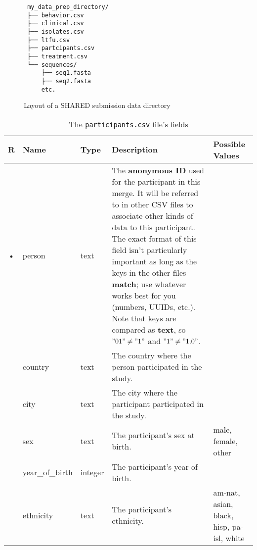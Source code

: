 \documentclass{article}
\begin{document}
\begin{figure}
  \caption{Layout of a SHARED submission data directory}
  \label{fig:data-prep-dir}
\begin{verbatim}
 my_data_prep_directory/
 ├── behavior.csv
 ├── clinical.csv
 ├── isolates.csv
 ├── ltfu.csv
 ├── partcipants.csv
 ├── treatment.csv
 └── sequences/
     ├── seq1.fasta
     ├── seq2.fasta
     etc.
\end{verbatim}
\end{figure}


\begin{table}[h!]
  \centering
  \caption{The \texttt{participants.csv} file's fields}
  \label{tbl:participants.csv}
  \begin{tabular}{cllp{6cm}p{4cm}}
    R & Name            & Type      & Description & Possible Values\\ \hline
    • & person          & text    &
      The \textbf{anonymous ID} used for the participant in this
      merge. It will be referred to in other CSV files to associate
      other kinds of data to this participant. The exact format of
      this field isn't particularly important as long as the keys in
      the other files \textbf{match}; use whatever works best for you
      (numbers, UUIDs, etc.). Note that keys are compared as
      \textbf{text}, so $"01" \neq "1"$ and $"1" \neq "1.0"$. 
      \\
      & country         & text    & The country where the person participated in the study. \\
      & city            & text    & The city where the participant participated in the study. \\
      & sex             & text    & The participant's sex at birth.  & male, female, other \\
      & year\_of\_birth & integer   & The participant's year of birth. \\
      & ethnicity       & text    & The participant's ethnicity. & am-nat, asian, black, hisp, pa-isl, white \\
  \end{tabular}
\end{table}
\end{document}
